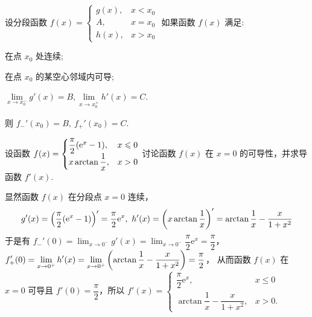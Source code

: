 \begin{theorem}
    设分段函数 $f(x)=\begin{cases}
            g(x) ,& x<x_0 \\A,&x=x_0\\h(x),&x>x_0
        \end{cases}$ 如果函数 $f(x)$ 满足:
    \begin{enumerate*}[label=(\arabic{*})]
        \item 在点 $x_0$ 处连续;
        \item 在点 $x_0$ 的某空心邻域内可导;
        \item $\lim\limits_{x\to x_0^-}g'(x)=B,\lim\limits_{x\to x_0^+}h'(x)=C$.
    \end{enumerate*}
    则 $f_{-}'(x_0)=B,~f_{+}'(x_0)=C.$
\end{theorem}

\begin{example}
    设函数 $f(x)=\begin{cases}
            \dfrac{\pi}{2}\qty(\mathrm{e}^x-1) ,&x\leqslant 0 \\ x\arctan\dfrac{1}{x},&x>0
        \end{cases}$
    讨论函数 $f(x)$ 在 $x=0$ 的可导性，并求导函数 $f'(x)$.
\end{example}
\begin{solution}
    显然函数 $f(x)$ 在分段点 $x=0$ 连续，$$g'(x)=\qty(\dfrac{\pi}{2}\qty(\mathrm{e}^x-1))'=\dfrac{\pi}{2}\mathrm{e}^x,~h'(x)=\qty(x\arctan\dfrac{1}{x})'=\arctan\dfrac{1}{x}-\dfrac{x}{1+x^2}$$
    于是有 $\displaystyle f_-'(0)=\lim_{x\to0^-}g'(x)=\lim_{x\to0^-}\dfrac{\pi}{2}\mathrm{e}^x=\dfrac{\pi}{2}$，$\displaystyle f_+'(0)=\lim_{x\to0^+}h'(x)=\lim_{x\to0^+}\qty(\arctan\dfrac{1}{x}-\dfrac{x}{1+x^2})=\dfrac{\pi}{2}$，
    从而函数 $f(x)$ 在 $x=0$ 可导且 $f'(0)=\dfrac{\pi}{2}$，所以 $f'(x)=\begin{cases}
            \dfrac{\pi}{2}\mathrm{e}^x ,&x\leqslant 0 \\ \arctan\dfrac{1}{x}-\dfrac{x}{1+x^2},&x>0.
        \end{cases}$
\end{solution}